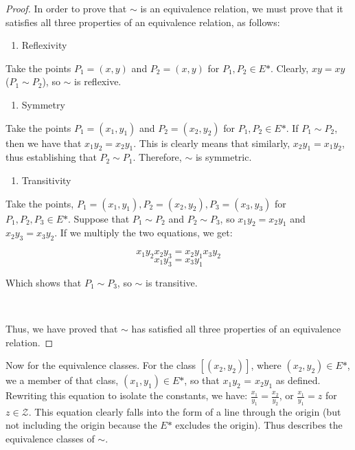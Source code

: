 \documentclass{article}
\begin{document}
\begin{proof}
    In order to prove that $\sim$ is an equivalence relation, we must prove that it satisfies all three properties of an equivalence relation, as follows:

    \begin{enumerate}
        \item Reflexivity
    \end{enumerate}

    Take the points $P_1 = (x, y)$ and $P_2 = (x, y)$ for $P_1, P_2 \in E\mbox{*}$. Clearly, $xy = xy$ ($P_1 \sim P_2$), so $\sim$ is reflexive.

    \begin{enumerate}[resume]
        \item Symmetry 
    \end{enumerate}

    Take the points $P_1 = (x_1, y_1)$ and $P_2 = (x_2, y_2)$ for $P_1, P_2 \in E\mbox{*}$. If $P_1 
    \sim P_2$, then we have that $x_1y_2 = x_2y_1$. This is clearly means that similarly, $x_2y_1 = x_1y_2$, thus establishing that $P_2 \sim P_1$. Therefore, $\sim$ is symmetric.
    
    \begin{enumerate}[resume]
        \item Transitivity
    \end{enumerate}

    Take the points, $P_1 = (x_1, y_1), P_2 = (x_2, y_2), P_3 = (x_3, y_3)$ for $P_1, P_2, P_3 \in E\mbox{*}$. Suppose that $P_1 \sim P_2$ and $P_2 \sim P_3$, so $x_1y_2 = x_2y_1$ and $x_2y_3 = x_3y_2$. If we multiply the two equations, we get:
    
    \[x_1y_2x_2y_3 = x_2y_1x_3y_2\]
    \[x_1y_3 = x_3y_1\]

    Which shows that $P_1 \sim P_3$, so $\sim$ is transitive.

    \,

    Thus, we have proved that $\sim$ has satisfied all three properties of an equivalence relation.
\end{proof}

Now for the equivalence classes. For the class $[(x_2, y_2)]$, where $(x_2, y_2) \in E\mbox{*}$, we a member of that class, $(x_1, y_1) \in E\mbox{*}$, so that $x_1y_2$ = $x_2y_1$ as defined. Rewriting this equation to isolate the constants, we have: $\frac{x_1}{y_1} = \frac{x_2}{y_2}$, or $\frac{x_1}{y_1} = z$ for $z \in \mathcal{Z}$. This equation clearly falls into the form of a line through the origin (but not including the origin because the $E\mbox{*}$ excludes the origin). Thus describes the equivalence classes of $\sim$.
\end{document}
